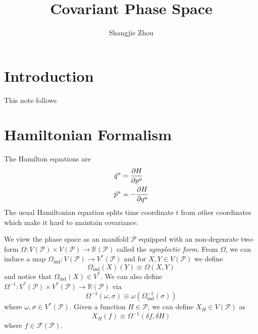 \documentclass[10pt]{article}
\begin{document}
\title{Covariant Phase Space}
\author{Shangjie Zhou}
\maketitle
{}
\section*{Introduction}
This note follows \cite{Harlow:2019yfa}

\section{Hamiltonian Formalism}
The Hamilton equations are
\begin{subequations}
    \begin{align}
        \dot{q}^a & =\pdv{H}{p^a}  \\
        \dot{p}^a & =-\pdv{H}{q^a}
    \end{align}
\end{subequations}
The usual Hamiltonian equation splits time coordinate $t$ from other coordinates which make it hard to maintain covariance.

We view the phase space as an manifold $\mathcal{P}$ equipped with an non-degenrate two-form $\Omega:V(\mathcal{P})\times V(\mathcal{P})\to\mathbb{R}(\mathcal{P})$ called the \textit{symplectic form}.
From $\Omega$, we can induce a map $\Omega_{\text{ind}}:V(\mathcal{P})\to V^\ast(\mathcal{P})$ and for $X,Y\in V(\mathcal{P})$ we define
\begin{equation}
    \Omega_{\text{ind}}(X)(Y)\equiv\Omega(X,Y)
\end{equation}
and notice that $\Omega_{\text{ind}}(X)\in V^\ast$.
We can also define $\Omega^{-1}:V^\ast(\mathcal{P})\times V^\ast(\mathcal{P})\to \mathbb{R}(\mathcal{P})$ via
\begin{equation}
    \Omega^{-1}(\omega,\sigma)\equiv\omega(\Omega_{\text{ind}}^{-1}(\sigma))
\end{equation}
where $\omega,\sigma\in V^\ast(\mathcal{P})$.
Given a function $H\in\mathcal{P}$, we can define $X_H\in V(\mathcal{P})$ as
\begin{equation}
    X_H(f)\equiv\Omega^{-1}(\delta f,\delta H)
\end{equation}
where $f\in\mathcal{F}(\mathcal{P})$.
\end{document}
